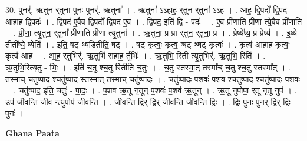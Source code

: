 \documentclass[17pt]{extarticle}
\begin{document}
30. पुनर्॑. ऋ॒तुन॒ र्‌तुना॒ पुनः॒ पुनर्॑. ऋ॒तुना᳚ । . ऋ॒तुना॑ ऽऽहाह॒ र्‌तुन॒ र्‌तुना॑ ऽऽह । . आ॒ह॒ द्वि॒पदो᳚ द्वि॒पद॑ आहाह द्वि॒पदः॑ । . द्वि॒पद॑ ए॒वैव द्वि॒पदो᳚ द्वि॒पद॑ ए॒व । . द्वि॒पद॒ इति॑ द्वि - पदः॑ । . ए॒व प्री॑णाति प्रीणा त्ये॒वैव प्री॑णाति । . प्री॒णा॒ त्यृ॒तुन॒ र्‌तुना᳚ प्रीणाति प्रीणा त्यृ॒तुना᳚ । . ऋ॒तुना॒ प्र प्रा र्‌तुन॒ र्‌तुना॒ प्र । . प्रेष्ये᳚ष्य॒ प्र प्रेष्य॑ । . इ॒ष्ये तीती᳚ष्ये॒ ष्येति॑ । . इति॒ षट् थ्षडितीति॒ षट् । . षट् कृत्वः॒ कृत्व॒ ष्षट् थ्षट् कृत्वः॑ । . कृत्व॑ आहाह॒ कृत्वः॒ कृत्व॑ आह । . आ॒ह॒ र्‌तुभिर्॑. ऋ॒तुभि॑ राहाह॒ र्तुभिः॑ । . ऋ॒तुभि॒ रिती त्यृ॒तुभिर्॑. ऋ॒तुभि॒ रिति॑ । . ऋ॒तुभि॒रित्यृ॒तु - भिः॒ । . इति॑ च॒तु श्च॒तु रितीति॑ च॒तुः । . च॒तु स्तस्मा॒त् तस्मा᳚च् च॒तु श्च॒तु स्तस्मा᳚त् । . तस्मा॒च् चतु॑ष्पाद॒ श्चतु॑ष्पाद॒ स्तस्मा॒त् तस्मा॒च् चतु॑ष्पादः । . चतु॑ष्पादः प॒शवः॑ प॒शव॒ श्चतु॑ष्पाद॒ श्चतु॑ष्पादः प॒शवः॑ । . चतु॑ष्पाद॒ इति॒ चतुः॑ - पा॒दः॒ । . प॒शव॑ ऋ॒तू नृ॒तून् प॒शवः॑ प॒शव॑ ऋ॒तून् । . ऋ॒तू नुपोपा॒ र्‌तू नृ॒तू नुप॑ । . उप॑ जीवन्ति जीव॒ न्त्युपोप॑ जीवन्ति । . जी॒व॒न्ति॒ द्विर् द्विर् जी॑वन्ति जीवन्ति॒ द्विः । . द्विः पुनः॒ पुन॒र् द्विर् द्विः पुनः॑ । \newline

\textbf{Ghana Paata } \newline
\end{document}
